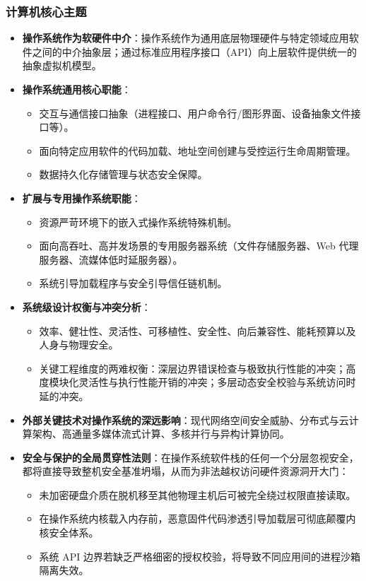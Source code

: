 \subsubsection{计算机核心主题}
\begin{itemize}\setlength{\itemsep}{0pt}\setlength{\parskip}{0pt}
    \item \textbf{操作系统作为软硬件中介}：操作系统作为通用底层物理硬件与特定领域应用软件之间的中介抽象层；通过标准应用程序接口（API）向上层软件提供统一的抽象虚拟机模型。
    \item \textbf{操作系统通用核心职能}：
    \begin{itemize}\setlength{\itemsep}{0pt}\setlength{\parskip}{0pt}
        \item 交互与通信接口抽象（进程接口、用户命令行/图形界面、设备抽象文件接口等）。
        \item 面向特定应用软件的代码加载、地址空间创建与受控运行生命周期管理。
        \item 数据持久化存储管理与状态安全保障。
    \end{itemize}
    \item \textbf{扩展与专用操作系统职能}：
    \begin{itemize}\setlength{\itemsep}{0pt}\setlength{\parskip}{0pt}
        \item 资源严苛环境下的嵌入式操作系统特殊机制。
        \item 面向高吞吐、高并发场景的专用服务器系统（文件存储服务器、Web 代理服务器、流媒体低时延服务器）。
        \item 系统引导加载程序与安全引导信任链机制。
    \end{itemize}
    \item \textbf{系统级设计权衡与冲突分析}：
    \begin{itemize}\setlength{\itemsep}{0pt}\setlength{\parskip}{0pt}
        \item 效率、健壮性、灵活性、可移植性、安全性、向后兼容性、能耗预算以及人身与物理安全。
        \item 关键工程维度的两难权衡：深层边界错误检查与极致执行性能的冲突；高度模块化灵活性与执行性能开销的冲突；多层动态安全校验与系统访问时延的冲突。
    \end{itemize}
    \item \textbf{外部关键技术对操作系统的深远影响}：现代网络空间安全威胁、分布式与云计算架构、高通量多媒体流式计算、多核并行与异构计算协同。
    \item \textbf{安全与保护的全局贯穿性法则}：在操作系统软件栈的任何一个分层忽视安全，都将直接导致整机安全基准坍塌，从而为非法越权访问硬件资源洞开大门：
    \begin{itemize}\setlength{\itemsep}{0pt}\setlength{\parskip}{0pt}
        \item 未加密硬盘介质在脱机移至其他物理主机后可被完全绕过权限直接读取。
        \item 在操作系统内核载入内存前，恶意固件代码渗透引导加载层可彻底颠覆内核安全体系。
        \item 系统 API 边界若缺乏严格细密的授权校验，将导致不同应用间的进程沙箱隔离失效。
    \end{itemize}
\end{itemize}

